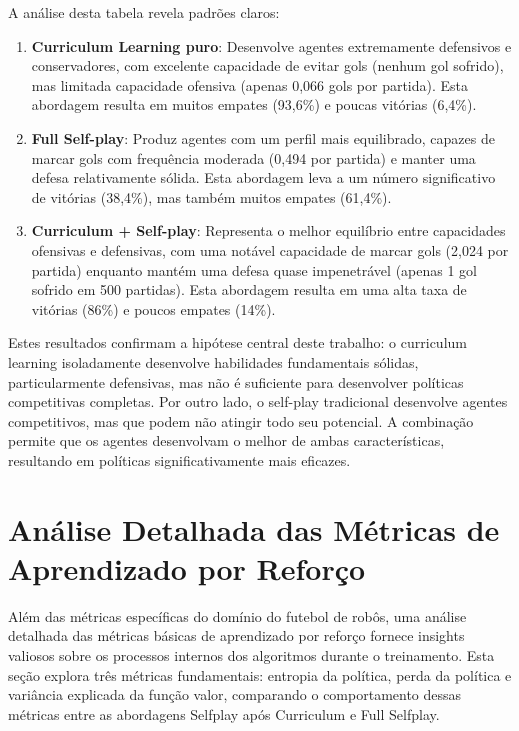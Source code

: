 A análise desta tabela revela padrões claros:

\begin{enumerate}
    \item \textbf{Curriculum Learning puro}: Desenvolve agentes extremamente defensivos e conservadores, com excelente capacidade de evitar gols (nenhum gol sofrido), mas limitada capacidade ofensiva (apenas 0,066 gols por partida). Esta abordagem resulta em muitos empates (93,6\%) e poucas vitórias (6,4\%).
    
    \item \textbf{Full Self-play}: Produz agentes com um perfil mais equilibrado, capazes de marcar gols com frequência moderada (0,494 por partida) e manter uma defesa relativamente sólida. Esta abordagem leva a um número significativo de vitórias (38,4\%), mas também muitos empates (61,4\%).
    
    \item \textbf{Curriculum + Self-play}: Representa o melhor equilíbrio entre capacidades ofensivas e defensivas, com uma notável capacidade de marcar gols (2,024 por partida) enquanto mantém uma defesa quase impenetrável (apenas 1 gol sofrido em 500 partidas). Esta abordagem resulta em uma alta taxa de vitórias (86\%) e poucos empates (14\%).
\end{enumerate}

Estes resultados confirmam a hipótese central deste trabalho: o curriculum learning isoladamente desenvolve habilidades fundamentais sólidas, particularmente defensivas, mas não é suficiente para desenvolver políticas competitivas completas. Por outro lado, o self-play tradicional desenvolve agentes competitivos, mas que podem não atingir todo seu potencial. A combinação permite que os agentes desenvolvam o melhor de ambas características, resultando em políticas significativamente mais eficazes.

\section{Análise Detalhada das Métricas de Aprendizado por Reforço}
\label{sec:analise_metricas_aprendizado}

Além das métricas específicas do domínio do futebol de robôs, uma análise detalhada das métricas básicas de aprendizado por reforço fornece insights valiosos sobre os processos internos dos algoritmos durante o treinamento. Esta seção explora três métricas fundamentais: entropia da política, perda da política e variância explicada da função valor, comparando o comportamento dessas métricas entre as abordagens Selfplay após Curriculum e Full Selfplay.

